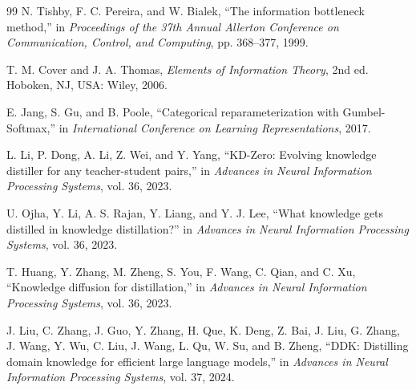 \documentclass[10pt,twocolumn,a4paper]{article}
\begin{document}
\begin{thebibliography}{99}
N. Tishby, F. C. Pereira, and W. Bialek, ``The information bottleneck method,'' in \emph{Proceedings of the 37th Annual Allerton Conference on Communication, Control, and Computing}, pp. 368--377, 1999.

T. M. Cover and J. A. Thomas, \emph{Elements of Information Theory}, 2nd ed. Hoboken, NJ, USA: Wiley, 2006.

E. Jang, S. Gu, and B. Poole, ``Categorical reparameterization with Gumbel-Softmax,'' in \emph{International Conference on Learning Representations}, 2017.

L. Li, P. Dong, A. Li, Z. Wei, and Y. Yang, ``KD-Zero: Evolving knowledge distiller for any teacher-student pairs,'' in \emph{Advances in Neural Information Processing Systems}, vol. 36, 2023.

U. Ojha, Y. Li, A. S. Rajan, Y. Liang, and Y. J. Lee, ``What knowledge gets distilled in knowledge distillation?'' in \emph{Advances in Neural Information Processing Systems}, vol. 36, 2023.

T. Huang, Y. Zhang, M. Zheng, S. You, F. Wang, C. Qian, and C. Xu, ``Knowledge diffusion for distillation,'' in \emph{Advances in Neural Information Processing Systems}, vol. 36, 2023.

J. Liu, C. Zhang, J. Guo, Y. Zhang, H. Que, K. Deng, Z. Bai, J. Liu, G. Zhang, J. Wang, Y. Wu, C. Liu, J. Wang, L. Qu, W. Su, and B. Zheng, ``DDK: Distilling domain knowledge for efficient large language models,'' in \emph{Advances in Neural Information Processing Systems}, vol. 37, 2024.

\end{thebibliography}
\end{document}
